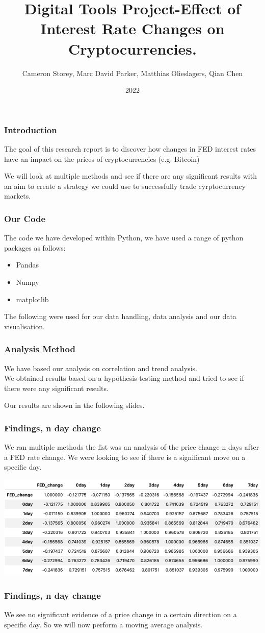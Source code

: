 \documentclass{beamer}
\title{Digital Tools Project-Effect of Interest Rate Changes on Cryptocurrencies.}
\author{Cameron Storey, Marc David Parker, Matthias Olieslagers, Qian Chen}
\institute{UZH Digital Tools for Finance}
\date{2022}
\begin{document}
\frame{\titlepage}

\begin{frame}
\frametitle{Introduction}
The goal of this research report is to discover how changes in FED interest rates have an impact on the prices of cryptocurrencies (e.g. Bitcoin) \newline

We will look at multiple methods and see if there are any significant results with an aim to create a strategy we could use to successfully trade cyrptocurrency markets.
\end{frame}

\begin{frame}
    \frametitle{Our Code}
    The code we have developed within Python, we have used a range of python packages as follows:
    \begin{itemize}
    \item Pandas
    \item Numpy
    \item matplotlib
\end{itemize}
The following were used for our data handling, data analysis and our data visualisation.
\end{frame}
\begin{frame}
\frametitle{Analysis Method}
We have based our analysis on correlation and trend analysis.\\

We obtained results based on a hypothesis testing method and tried to see if there were any significant results.\newline

Our results are shown in the following slides.
\end{frame}
\begin{frame}
    \frametitle{Findings, n day change}
We ran multiple methods the fist was an analysis of the price change n days after a FED rate change. We were looking to see if there is a significant move on a specific day. \\
\begin{center}
    \includegraphics[width=1\textwidth]{research_project/text/paper/fed_chng_corr.png}
\end{center}


\end{frame}
\begin{frame}
    \frametitle{Findings, n day change}
We see no significant evidence of a price change in a certain direction on a specific day. So we will now perform a moving average analysis.
\end{frame}
\end{document}
